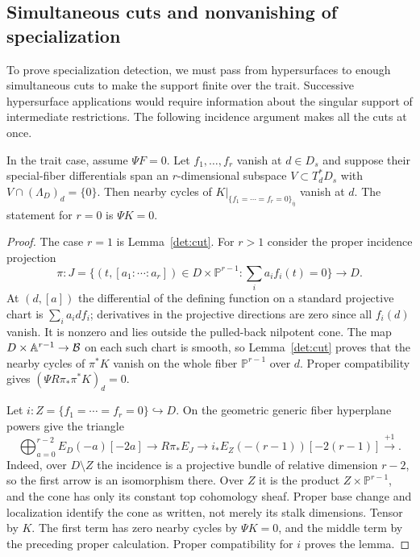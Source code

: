 \subsection{Simultaneous cuts and nonvanishing of specialization}

To prove specialization detection, we must pass from hypersurfaces to
enough simultaneous cuts to make the support finite over the trait.
Successive hypersurface applications would require information about the
singular support of intermediate restrictions.  The following incidence
argument makes all the cuts at once.

\begin{lemma}\label{det:simultaneous}
In the trait case, assume $\Psi F=0$.  Let $f_1,\ldots,f_r$ vanish at
$d\in D_s$ and suppose their special-fiber differentials span an
$r$-dimensional subspace $V\subset T_d^*D_s$ with
$V\cap(\Lambda_D)_d=\{0\}$.  Then nearby cycles of
$K|_{\{f_1=\cdots=f_r=0\}_{\bar\eta}}$ vanish at $d$.
The statement for $r=0$ is $\Psi K=0$.
\end{lemma}

\begin{proof}
The case $r=1$ is Lemma~\ref{det:cut}.  For $r>1$
consider the proper incidence projection
\[
 \pi:J=\{(t,[a_1:\cdots:a_r])\in D\times\mathbb P^{r-1}:
                   \textstyle\sum_i a_i f_i(t)=0\}\longrightarrow D.
\]
At $(d,[a])$ the differential of the defining function on a standard
projective chart is $\sum_i a_i df_i$; derivatives in the projective
directions are zero since all $f_i(d)$ vanish.  It is nonzero and lies
outside the pulled-back nilpotent cone.  The map
$D\times\mathbb A^{r-1}\to\mathcal B$ on each such chart is smooth, so
Lemma~\ref{det:cut} proves that the nearby cycles of
$\pi^*K$ vanish on the whole fiber $\mathbb P^{r-1}$ over $d$.
Proper compatibility gives $(\Psi R\pi_*\pi^*K)_d=0$.

Let $i:Z=\{f_1=\cdots=f_r=0\}\hookrightarrow D$.  On the geometric
generic fiber hyperplane powers give the triangle
\[
 \bigoplus_{a=0}^{r-2}E_D(-a)[-2a]\longrightarrow R\pi_*E_J
 \longrightarrow i_*E_Z(-(r-1))[-2(r-1)]\xrightarrow{+1}.
\]
Indeed, over $D\setminus Z$ the incidence is a projective bundle of
relative dimension $r-2$, so the first arrow is an isomorphism there.
Over $Z$ it is the product $Z\times\mathbb P^{r-1}$, and the cone has
only its constant top cohomology sheaf.  Proper base change and
localization identify the cone as written, not merely its stalk
dimensions.  Tensor by $K$.  The first term has zero nearby cycles by
$\Psi K=0$, and the middle term by the preceding proper calculation.
Proper compatibility for $i$ proves the lemma.
\end{proof}


